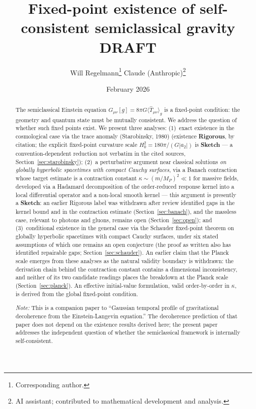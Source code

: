 \documentclass[12pt,a4paper]{article}
\title{\textbf{Fixed-point existence of self-consistent semiclassical gravity}\\[6pt]
{\large DRAFT}}
\author{Will Regelmann\thanks{Corresponding author.} \quad Claude (Anthropic)\thanks{AI
assistant; contributed to mathematical development and analysis.}}
\date{February 2026}
\begin{document}
\maketitle

\begin{abstract}
The semiclassical Einstein equation $G_{\mu\nu}[g] = 8\pi G\langle\hat{T}_{\mu\nu}\rangle_g$
is a fixed-point condition: the geometry and quantum state must be mutually consistent.
We address the question of whether such fixed points exist. We present three analyses:
(1)~exact existence in the cosmological case via the trace anomaly
(Starobinsky, 1980) (existence \textbf{Rigorous}, by citation; the explicit fixed-point
curvature scale $H_0^2 = 180\pi/(G|a_2|)$ is \textbf{Sketch} --- a convention-dependent
reduction not verbatim in the cited sources, Section~\ref{sec:starobinsky}); (2)~a perturbative argument near
classical solutions \emph{on globally hyperbolic spacetimes with compact Cauchy surfaces},
via a Banach contraction whose target estimate is a contraction constant
$\kappa \sim (m/M_P)^2 \ll 1$ for massive fields, developed via a Hadamard decomposition
of the order-reduced response kernel into a local differential operator and a non-local
smooth kernel --- this argument is presently a \textbf{Sketch}: an earlier Rigorous label
was withdrawn after review identified gaps in the kernel bound and in the contraction
estimate (Section~\ref{sec:banach}), and the massless case, relevant to photons and gluons,
remains open (Section~\ref{sec:open}); and (3)~conditional existence in the general
case via the Schauder fixed-point theorem on globally hyperbolic spacetimes with compact
Cauchy surfaces, under six stated assumptions of which one remains an open conjecture
(the proof as written also has identified repairable gaps; Section~\ref{sec:schauder}).
An earlier claim that the Planck scale emerges from these analyses as the natural validity
boundary is withdrawn: the derivation chain behind the contraction constant contains a
dimensional inconsistency, and neither of its two candidate readings places the breakdown
at the Planck scale (Section~\ref{sec:planck}). An effective initial-value formulation,
valid order-by-order in $\kappa$, is derived from the global fixed-point condition.

\bigskip\noindent\textit{Note:} This is a companion paper to ``Gaussian temporal profile
of gravitational decoherence from the Einstein-Langevin equation.'' The decoherence
prediction of that paper does not depend on the existence results derived here; the present
paper addresses the independent question of whether the semiclassical framework is
internally self-consistent.
\end{abstract}
\end{document}
